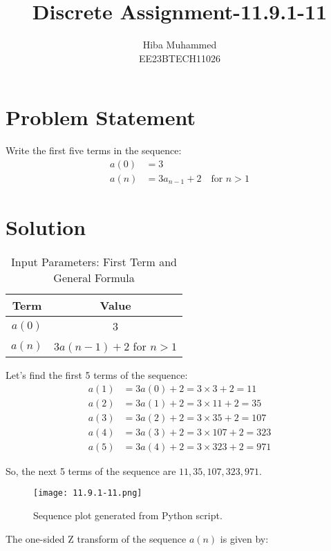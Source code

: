 \documentclass[12pt]{article}
\begin{document}
\title{Discrete Assignment-11.9.1-11}
\author{Hiba Muhammed \\
        EE23BTECH11026}
\maketitle

\section*{Problem Statement}
Write the first five terms in the sequence:
\[
\begin{aligned}
a(0)  &= 3 \\
a(n)  &= 3a_{n-1} + 2 \quad \text{for } n > 1
\end{aligned}
\]

\section*{Solution}
\begin{table}[h]
  \centering
  \caption{Input Parameters: First Term and General Formula}
  \begin{tabular}{|c|c|}
    \hline
    \textbf{Term} & \textbf{Value} \\
    \hline
    \(a(0) \) & 3 \\
    \(a(n)\) & \(3a(n-1) + 2\) for \(n > 1\) \\
    \hline
  \end{tabular}
\end{table}
Let's find the first 5 terms of the sequence:
\begin{align}
a(1) &= 3a(0)  + 2 = 3 \times 3 + 2 = 11 \\a(2) &= 3a(1) + 2 = 3 \times 11 + 2 = 35 \\
a(3) &= 3a(2) + 2 = 3 \times 35 + 2 = 107 \\a(4) &= 3a(3) + 2 = 3 \times 107 + 2 = 323 \\
a(5) &= 3a(4) + 2 = 3 \times 323 + 2 = 971 
\end{align}

So, the next 5 terms of the sequence are \(11, 35, 107, 323, 971\).
\begin{figure}[h]
    \centering
    \texttt{[image: 11.9.1-11.png]}
    \caption{Sequence plot generated from Python script.}
    \label{fig:sequence-plot}
\end{figure}

The one-sided Z transform of the sequence \(a(n)\) is given by:
\end{document}

